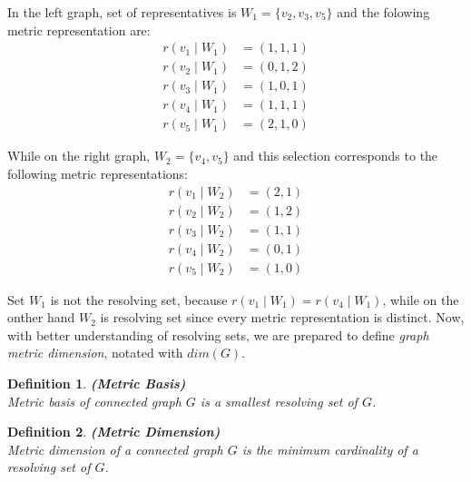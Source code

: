 \documentclass[12pt]{amsart}
\theoremstyle{plain}
\newtheorem*{definition}{Definition}
\begin{document}
\vspace{-1cm}
\begin{minipage}[t]{0.45\textwidth}
  In the left graph, set of representatives is $ W_1 = \{ v_2, v_3, v_5 \} $ and the folowing metric representation are: \\[1pt]
  \vspace{-0.4cm}
  \begin{align*}
    r(v_1 \mid W_1) &= (1, 1, 1) \\
    r(v_2 \mid W_1) &= (0, 1, 2) \\
    r(v_3 \mid W_1) &= (1, 0, 1) \\
    r(v_4 \mid W_1) &= (1, 1, 1) \\
    r(v_5 \mid W_1) &= (2, 1, 0)
  \end{align*}
\end{minipage}
\hfill
\begin{minipage}[t]{0.45\textwidth}
  While on the right graph, $W_2 = \{ v_4, v_5 \} $ and this selection corresponds to the following metric representations: \\[1pt]
  \vspace{-0.4cm}
  \begin{align*}
    r(v_1 \mid W_2) &= (2, 1) \\
    r(v_2 \mid W_2) &= (1, 2) \\
    r(v_3 \mid W_2) &= (1, 1) \\
    r(v_4 \mid W_2) &= (0, 1) \\
    r(v_5 \mid W_2) &= (1, 0)
  \end{align*}
\end{minipage}

Set $W_1$ is not the resolving set, because $r(v_1 \mid W_1) = r(v_4 \mid W_1) $, while on the onther hand $W_2$ is resolving set since every metric representation is distinct. Now, with better understanding of resolving sets, we are prepared to define \textit{graph metric dimension}, notated with $ dim(G)$.

\vspace{-0.2cm}

\begin{definition} \textbf{(Metric Basis)} \\
  \textit{Metric basis} of connected graph $G$ is a smallest resolving set of $G$.
\end{definition}

\vspace{-0.4cm}

\begin{definition} \textbf{(Metric Dimension)} \\
  \textit{Metric dimension} of a connected graph $G$ is the minimum cardinality of a resolving set of $G$.
\end{definition}
\end{document}
